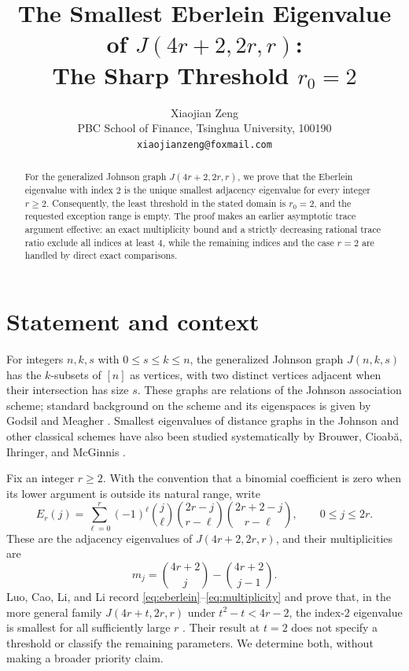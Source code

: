\documentclass[11pt]{article}
\title{The Smallest Eberlein Eigenvalue of $J(4r+2,2r,r)$:\\
The Sharp Threshold $r_0=2$}
\author{Xiaojian Zeng\\
PBC School of Finance, Tsinghua University, 100190\\
\texttt{xiaojianzeng@foxmail.com}}
\date{}
\begin{document}
\maketitle

\begin{abstract}
For the generalized Johnson graph $J(4r+2,2r,r)$, we prove that the
Eberlein eigenvalue with index $2$ is the unique smallest adjacency
eigenvalue for every integer $r\geq2$.  Consequently, the least threshold in
the stated domain is $r_0=2$, and the requested exception range is empty.
The proof makes an earlier asymptotic trace argument effective: an exact
multiplicity bound and a strictly decreasing rational trace ratio exclude all
indices at least $4$, while the remaining indices and the case $r=2$ are
handled by direct exact comparisons.
\end{abstract}

\section{Statement and context}

For integers $n,k,s$ with $0\leq s\leq k\leq n$, the generalized Johnson
graph $J(n,k,s)$ has the $k$-subsets of $[n]$ as vertices, with two distinct
vertices adjacent when their intersection has size $s$.  These graphs are
relations of the Johnson association scheme; standard background on the
scheme and its eigenspaces is given by Godsil and Meagher
\cite[Chapter~6]{GodsilMeagher2016}.  Smallest eigenvalues of distance graphs
in the Johnson and other classical schemes have also been studied
systematically by Brouwer, Cioabă, Ihringer, and McGinnis
\cite{BrouwerEtAl2018}.

Fix an integer $r\geq2$.  With the convention that a binomial coefficient is
zero when its lower argument is outside its natural range, write
\begin{equation}\label{eq:eberlein}
 E_r(j)=\sum_{\ell=0}^{r}(-1)^\ell
 \binom{j}{\ell}\binom{2r-j}{r-\ell}
 \binom{2r+2-j}{r-\ell},
 \qquad 0\leq j\leq2r.
\end{equation}
These are the adjacency eigenvalues of $J(4r+2,2r,r)$, and their
multiplicities are
\begin{equation}\label{eq:multiplicity}
 m_j=\binom{4r+2}{j}-\binom{4r+2}{j-1}.
\end{equation}
Luo, Cao, Li, and Li record \eqref{eq:eberlein}--\eqref{eq:multiplicity}
and prove that, in the more general family $J(4r+t,2r,r)$ under
$t^2-t<4r-2$, the index-$2$ eigenvalue is smallest for all sufficiently
large $r$ \cite[Eqns.~(2.1)--(2.2) and Proposition~12]{LuoEtAl2026}.
Their result at $t=2$ does not specify a threshold or classify the remaining
parameters.  We determine both, without making a broader priority claim.
\end{document}
